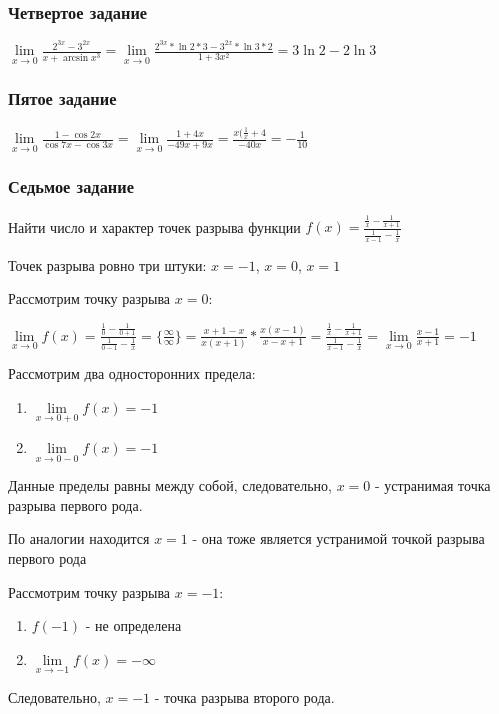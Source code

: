 \documentclass{article}
\begin{document}
\begin{flushleft}
\subsubsection{Четвертое задание}

$
\lim\limits_{x \to 0} \frac{2^{3x} - 3^{2x}}{x + \arcsin x^3}
=
\lim\limits_{x \to 0} \frac{2^{3x} * \ln 2 * 3 - 3^{2x} * \ln 3 * 2}{1 + 3x^2}
=
3\ln 2 - 2\ln 3
$

\subsubsection{Пятое задание}

$
\lim\limits_{x \to 0} \frac{1 - \cos 2x}{\cos 7x - \cos 3x}
=
\lim\limits_{x \to 0} \frac{1 + 4x}{-49x + 9x}
=
\frac{x(\frac{1}{x} + 4}{-40x}
=
-\frac{1}{10}
$

\subsubsection{Седьмое задание}

Найти число и характер точек разрыва функции $f(x) = \frac{\frac{1}{x} - \frac{1}{x + 1}}{\frac{1}{x - 1} - \frac{1}{x}}$

Точек разрыва ровно три штуки: $x = -1$, $x = 0$, $x = 1$

\hfill

Рассмотрим точку разрыва $x = 0$:

$
\lim\limits_{x \to 0} f(x) = \frac{\frac{1}{0} - \frac{1}{0 + 1}}{\frac{1}{0 - 1} - \frac{1}{x}} = \{ \frac{\infty}{\infty} \} = \frac{x + 1 - x}{x(x+1)} * \frac{x(x - 1)}{x - x + 1} = \frac{\frac{1}{x} - \frac{1}{x + 1}}{\frac{1}{x - 1} - \frac{1}{x}} = \lim\limits_{x \to 0} \frac{x - 1}{x + 1} = -1
$

Рассмотрим два односторонних предела:

\begin{enumerate}
    \item $\lim\limits_{x \to 0 + 0} f(x) = -1$
    \item $\lim\limits_{x \to 0 - 0} f(x) = -1$
\end{enumerate}

Данные пределы равны между собой, следовательно, $x = 0$ - устранимая точка разрыва первого рода.

\hfill

По аналогии находится $x = 1$ - она тоже является устранимой точкой разрыва первого рода

\hfill

Рассмотрим точку разрыва $x = -1$:

\begin{enumerate}
    \item $f(-1)$ - не определена
    \item $\lim\limits_{x \to -1} f(x) = -\infty$
\end{enumerate}

Следовательно, $x = -1$ - точка разрыва второго рода.

\end{flushleft}
\end{document}
